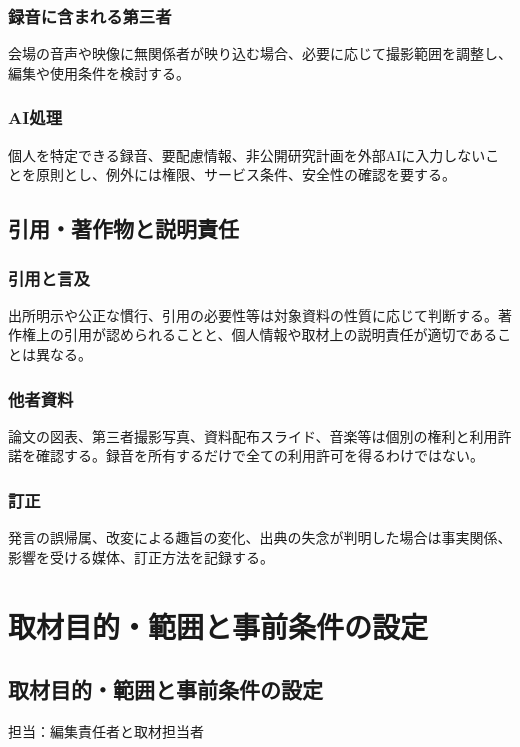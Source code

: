\documentclass[a4paper,11pt]{article}
\begin{document}
\subsubsection{録音に含まれる第三者}
\par 会場の音声や映像に無関係者が映り込む場合、必要に応じて撮影範囲を調整し、編集や使用条件を検討する。\par\medskip
\subsubsection{AI処理}
\par 個人を特定できる録音、要配慮情報、非公開研究計画を外部AIに入力しないことを原則とし、例外には権限、サービス条件、安全性の確認を要する。\par\medskip
\subsection{引用・著作物と説明責任}
\subsubsection{引用と言及}
\par 出所明示や公正な慣行、引用の必要性等は対象資料の性質に応じて判断する。著作権上の引用が認められることと、個人情報や取材上の説明責任が適切であることは異なる。\par\medskip
\subsubsection{他者資料}
\par 論文の図表、第三者撮影写真、資料配布スライド、音楽等は個別の権利と利用許諾を確認する。録音を所有するだけで全ての利用許可を得るわけではない。\par\medskip
\subsubsection{訂正}
\par 発言の誤帰属、改変による趣旨の変化、出典の失念が判明した場合は事実関係、影響を受ける媒体、訂正方法を記録する。\par\medskip
\section{取材目的・範囲と事前条件の設定}
\subsection{取材目的・範囲と事前条件の設定}
\par 担当：編集責任者と取材担当者\par\medskip
\end{document}
